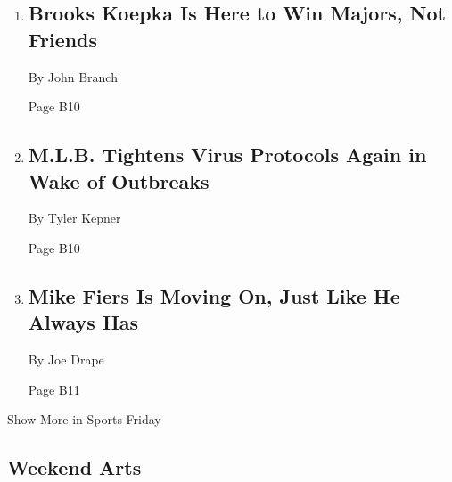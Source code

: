 \begin{enumerate}
\def\labelenumi{\arabic{enumi}.}
\item
  \href{/2020/08/07/sports/brooks-koepka-pga-championship.html}{}

  \hypertarget{brooks-koepka-is-here-to-win-majors-not-friends-1}{%
  \subsection{Brooks Koepka Is Here to Win Majors, Not
  Friends}\label{brooks-koepka-is-here-to-win-majors-not-friends-1}}

  By John Branch

  Page B10
\item
  \href{/2020/08/06/sports/baseball/mlb-safety-protocols.html}{}

  \hypertarget{mlb-tightens-virus-protocols-again-in-wake-of-outbreaks-1}{%
  \subsection{M.L.B. Tightens Virus Protocols Again in Wake of
  Outbreaks}\label{mlb-tightens-virus-protocols-again-in-wake-of-outbreaks-1}}

  By Tyler Kepner

  Page B10
\item
  \href{/2020/08/06/sports/as-mike-fiers-astros-cheating.html}{}

  \hypertarget{mike-fiers-is-moving-on-just-like-he-always-has}{%
  \subsection{Mike Fiers Is Moving On, Just Like He Always
  Has}\label{mike-fiers-is-moving-on-just-like-he-always-has}}

  By Joe Drape

  Page B11
\end{enumerate}

Show More in Sports Friday

\hypertarget{weekend-arts}{%
\subsection{Weekend Arts}\label{weekend-arts}}


